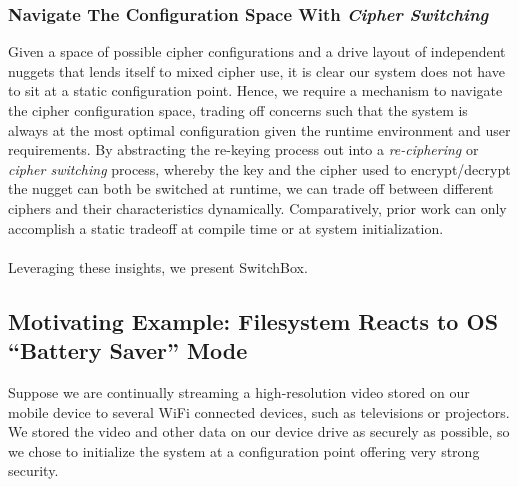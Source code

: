 \subsubsection{Navigate The Configuration Space With \emph{Cipher Switching}}

Given a space of possible cipher configurations and a drive layout of
independent nuggets that lends itself to mixed cipher use, it is clear our
system does not have to sit at a static configuration point. Hence, we require a
mechanism to navigate the cipher configuration space, trading off concerns such
that the system is always at the most optimal configuration given the runtime
environment and user requirements. By abstracting the re-keying process out into
a \emph{re-ciphering} or \emph{cipher switching} process, whereby the key and
the cipher used to encrypt/decrypt the nugget can both be switched at runtime,
we can trade off between different ciphers and their characteristics
dynamically. Comparatively, prior work can only accomplish a static tradeoff at
compile time or at system initialization. \\
\\
Leveraging these insights, we present SwitchBox. 

\subsection{Motivating Example: Filesystem Reacts to OS ``Battery Saver'' Mode}


Suppose we are continually streaming a high-resolution video stored on our
mobile device to several WiFi connected devices, such as televisions or
projectors. We stored the video and other data on our device drive as securely
as possible, so we chose to initialize the system at a configuration point
offering very strong security.

